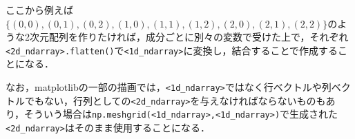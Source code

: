 ここから例えば$\{(0,0),(0,1),(0,2),(1,0),(1,1),(1,2),(2,0),(2,1),(2,2)\}$のような2次元配列を作りたければ，成分ごとに別々の変数で受けた上で，それぞれ\texttt{<2d\_ndarray>.flatten()}で\texttt{<1d\_ndarray>}に変換し，結合することで作成することになる．

\begin{cod}[\texttt{num10.py}]　
}]{code/num10.py}
\vspace{-10pt}
\begin{lstlisting}
grid=
[array([[0, 1, 2],
       [0, 1, 2],
       [0, 1, 2]]), array([[0, 0, 0],
       [1, 1, 1],
       [2, 2, 2]])]
type=<class 'list'>
grid=
[[0 0]
 [1 0]
 [2 0]
 [0 1]
 [1 1]
 [2 1]
 [0 2]
 [1 2]
 [2 2]]
type=<class 'numpy.ndarray'>
\end{lstlisting}
\end{cod}
\vspace{-10pt}

なお，matplotlibの一部の描画では，\texttt{<1d\_ndarray>}ではなく行ベクトルや列ベクトルでもない，行列としての\texttt{<2d\_ndarray>}を与えなければならないものもあり，そういう場合は\texttt{np.meshgrid(<1d\_ndarray>,<1d\_ndarray>)}で生成された\texttt{<2d\_ndarray>}はそのまま使用することになる．
